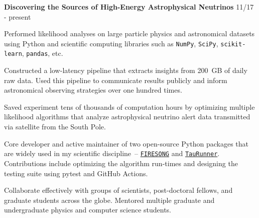 \vspace{-0.3cm}
\begin{cventries}
  \cventry
    {\hspace{0.25in}\textbf{Discovering the Sources of High-Energy Astrophysical Neutrinos}}
    {}
    {}
    {11/17 - present}
    {
    \begin{nestcvitems}
      \vspace{-0.1cm}
      \item {Performed likelihood analyses on large particle physics and astronomical datasets using Python and scientific computing libraries such as \texttt{NumPy}, \texttt{SciPy}, \texttt{scikit-learn}, \texttt{pandas}, etc.}
      \item {Constructed a low-latency pipeline that extracts insights from 200~GB of daily raw data. Used this pipeline to communicate results publicly and inform astronomical observing strategies over one hundred times.}
      \item {Saved experiment tens of thousands of computation hours by optimizing multiple likelihood algorithms that analyze astrophysical neutrino alert data transmitted via satellite from the South Pole.}
      \item{Core developer and active maintainer of two open-source Python packages that are widely used in my scientific discipline~-- \href{https://github.com/icecube/FIRESONG}{\faGithub\acvHeaderIconSep\texttt{FIRESONG}} and \href{https://github.com/icecube/TauRunner}{\faGithub\acvHeaderIconSep\texttt{TauRunner}}. Contributions include optimizing the algorithm run-times and designing the testing suite using pytest and GitHub Actions.}
      \item {Collaborate effectively with groups of scientists, post-doctoral fellows, and graduate students across the globe. Mentored multiple graduate and undergraduate physics and computer science students.}
    \end{nestcvitems}
}
\end{cventries}
